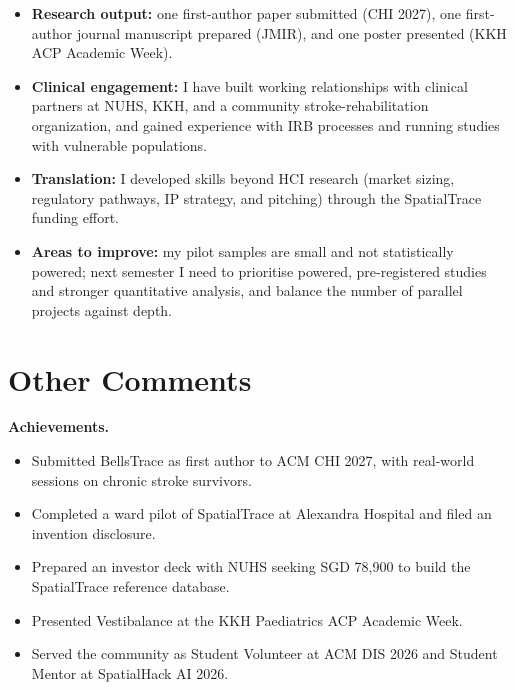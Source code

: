 \documentclass[12pt]{article}
\begin{document}
\begin{itemize}[leftmargin=1.5em]
    \item \textbf{Research output:} one first-author paper submitted (CHI 2027), one first-author journal manuscript prepared (JMIR), and one poster presented (KKH ACP Academic Week).
    \item \textbf{Clinical engagement:} I have built working relationships with clinical partners at NUHS, KKH, and a community stroke-rehabilitation organization, and gained experience with IRB processes and running studies with vulnerable populations.
    \item \textbf{Translation:} I developed skills beyond HCI research (market sizing, regulatory pathways, IP strategy, and pitching) through the SpatialTrace funding effort.
    \item \textbf{Areas to improve:} my pilot samples are small and not statistically powered; next semester I need to prioritise powered, pre-registered studies and stronger quantitative analysis, and balance the number of parallel projects against depth.
\end{itemize}

\section{Other Comments}

\textbf{Achievements.}
\begin{itemize}[leftmargin=1.5em]
    \item Submitted BellsTrace as first author to ACM CHI 2027, with real-world sessions on chronic stroke survivors.
    \item Completed a ward pilot of SpatialTrace at Alexandra Hospital and filed an invention disclosure.
    \item Prepared an investor deck with NUHS seeking SGD 78,900 to build the SpatialTrace reference database.
    \item Presented Vestibalance at the KKH Paediatrics ACP Academic Week.
    \item Served the community as Student Volunteer at ACM DIS 2026 and Student Mentor at SpatialHack AI 2026.
\end{itemize}
\end{document}
